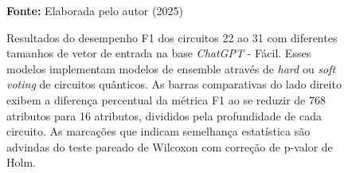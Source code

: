 \begin{figure}
\caption{Resultados do desempenho F1 dos circuitos 22 ao 31 com diferentes tamanhos de vetor de entrada na base \textit{ChatGPT} - Fácil. Esses modelos implementam modelos de ensemble através de \textit{hard} ou \textit{soft voting} de circuitos quânticos. As barras comparativas do lado direito exibem a diferença percentual da métrica F1 ao se reduzir de 768 atributos para 16 atributos, divididos pela profundidade de cada circuito. As marcações que indicam semelhança estatística são advindas do teste pareado de Wilcoxon com correção de p-valor de Holm.}
\label{fig:n_features:easy:g7}
     \centering
    \centering
      \par\medskip\ABNTEXfontereduzida\selectfont\textbf{Fonte:} Elaborada pelo autor (2025) \par\medskip
\end{figure}